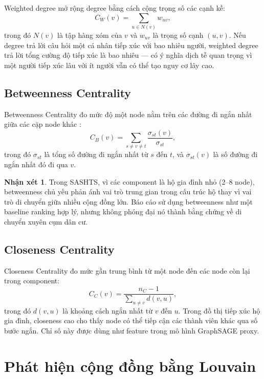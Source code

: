 \documentclass[12pt,a4paper]{report}
\theoremstyle{definition}
\newtheorem{remark}{Nhận xét}[chapter]
\begin{document}
Weighted degree mở rộng degree bằng cách cộng trọng số các cạnh kề:
\begin{equation}
  C_W(v) = \sum_{u \in N(v)} w_{uv},
  \label{eq:weighted_degree}
\end{equation}
trong đó $N(v)$ là tập hàng xóm của $v$ và $w_{uv}$ là trọng số cạnh $(u,v)$. Nếu degree trả lời câu hỏi một cá nhân tiếp xúc với bao nhiêu người, weighted degree trả lời tổng cường độ tiếp xúc là bao nhiêu --- có ý nghĩa dịch tễ quan trọng vì một người tiếp xúc lâu với ít người vẫn có thể tạo nguy cơ lây cao.

\subsection{Betweenness Centrality}

Betweenness Centrality đo mức độ một node nằm trên các đường đi ngắn nhất giữa các cặp node khác \cite{freeman1977}:
\begin{equation}
  C_B(v) = \sum_{s \neq v \neq t} \frac{\sigma_{st}(v)}{\sigma_{st}},
  \label{eq:betweenness}
\end{equation}
trong đó $\sigma_{st}$ là tổng số đường đi ngắn nhất từ $s$ đến $t$, và $\sigma_{st}(v)$ là số đường đi ngắn nhất đó đi qua $v$.

\begin{remark}
Trong SASHTS, vì các component là hộ gia đình nhỏ (2--8 node), betweenness chủ yếu phản ánh vai trò trung gian trong cấu trúc hộ thay vì vai trò di chuyển giữa nhiều cộng đồng lớn. Báo cáo sử dụng betweenness như một baseline ranking hợp lý, nhưng không phóng đại nó thành bằng chứng về di chuyển xuyên cụm dân cư.
\end{remark}

\subsection{Closeness Centrality}

Closeness Centrality đo mức gần trung bình từ một node đến các node còn lại trong component:
\begin{equation}
  C_C(v) = \frac{n_C - 1}{\sum_{u \neq v} d(v,u)},
  \label{eq:closeness}
\end{equation}
trong đó $d(v,u)$ là khoảng cách ngắn nhất từ $v$ đến $u$. Trong đồ thị tiếp xúc hộ gia đình, closeness cao cho thấy node có thể tiếp cận các thành viên khác qua số bước ngắn. Chỉ số này được dùng như feature trong mô hình GraphSAGE proxy.

\section{Phát hiện cộng đồng bằng Louvain}
\end{document}
